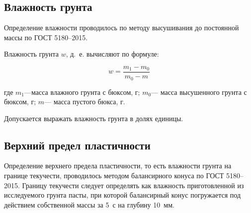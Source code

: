 
\subsection{Влажность грунта}

Определение влажности проводилось по методу высушивания до постоянной массы по ГОСТ 5180--2015. 
%

Влажность грунта $w$, д.~е. вычисляют по формуле:

\[
   w = \frac{m_1-m_0}{m_0-m}
\]

где $m_1$---масса влажного грунта с бюксом, г;
$m_0$--- масса высушенного грунта с бюксом, г;
$m$--- масса пустого бюкса, г.

Допускается выражать влажность грунта в долях единицы.

\subsection{Верхний предел пластичности}

Определение верхнего предела пластичности, то есть влажности грунта на границе текучести, 
проводилось методом балансирного конуса по ГОСТ 5180--2015.
Границу текучести следует определять как влажность приготовленной из исследуемого грунта пасты, 
при которой балансирный конус погружается
под действием собственной массы за 5~с на глубину 10~мм.

